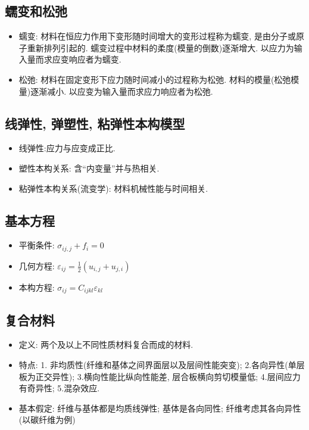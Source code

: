 \documentclass[a4paper,titlepage,twocolumn]{article}
\begin{document}
\subsection{蠕变和松弛}
\begin{itemize}
\item 蠕变: 材料在恒应力作用下变形随时间增大的变形过程称为蠕变, 是由分子或原子重新排列引起的. 蠕变过程中材料的柔度(模量的倒数)逐渐增大. 以应力为输入量而求应变响应者为蠕变.

\item 松弛: 材料在固定变形下应力随时间减小的过程称为松弛. 材料的模量(松弛模量)逐渐减小. 以应变为输入量而求应力响应者为松弛.

\end{itemize}


\subsection{线弹性, 弹塑性, 粘弹性本构模型}
\begin{itemize}
\item 线弹性:应力与应变成正比.
\item 塑性本构关系: 含``内变量''并与热相关.
\item 粘弹性本构关系(流变学): 材料机械性能与时间相关.
\end{itemize}

\subsection{基本方程}
\begin{itemize}
\item 平衡条件: $\sigma_{ij,j} + f_i = 0$
\item 几何方程: $\varepsilon_{ij}=\frac{1}{2}(u_{i,j}+u_{j,i})$
\item 本构方程: $\sigma_{ij} = C_{ijkl}\varepsilon_{kl}$
\end{itemize}

\subsection{复合材料}
\begin{itemize}
\item 定义: 两个及以上不同性质材料复合而成的材料. 
\item 特点: 1. 非均质性(纤维和基体之间界面层以及层间性能突变); 2.各向异性(单层板为正交异性); 3.横向性能比纵向性能差, 层合板横向剪切模量低; 4.层间应力有奇异性; 5.混杂效应.
\item 基本假定: 纤维与基体都是均质线弹性; 基体是各向同性; 纤维考虑其各向异性(以碳纤维为例)
\end{itemize}
\end{document}
